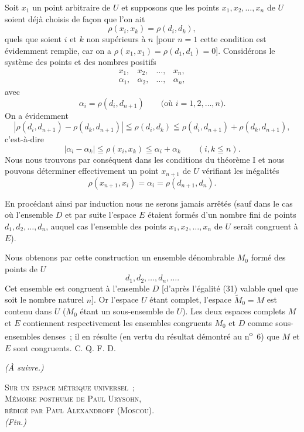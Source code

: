 \documentclass[a4paper,12pt]{amsart}
\newcommand{\srcpage}[1]{} %
\begin{document}
Soit $x_1$ un point arbitraire de $U$ et supposons que les points $x_1,x_2,\dots,x_n$ de $U$ soient déjà choisis de façon que l'on ait
\begin{equation}\tag{30}
\rho(x_i,x_k)=\rho(d_i,d_k),
\end{equation}
quels que soient $i$ et $k$ non supérieurs à $n$ [pour $n=1$ cette condition est évidemment remplie, car on a $\rho(x_1,x_1)=\rho(d_1,d_1)=0$]. Considérons le système des points et des nombres positifs
\[
\begin{array}{cccc}
x_1,&x_2,&\dots,&x_n,\\
\alpha_1,&\alpha_2,&\dots,&\alpha_n,
\end{array}
\]
avec
\[
\alpha_i=\rho(d_i,d_{n+1})\qquad\text{(où $i=1,2,\dots,n$).}
\]
On a évidemment
\[
|\rho(d_i,d_{n+1})-\rho(d_k,d_{n+1})|\leqq\rho(d_i,d_k)
\leqq\rho(d_i,d_{n+1})+\rho(d_k,d_{n+1}),
\]
c'est-à-dire
\[
|\alpha_i-\alpha_k|\leqq\rho(x_i,x_k)\leqq\alpha_i+\alpha_k\qquad(i,k\leqq n).
\]
Nous nous trouvons par conséquent dans les conditions du théorème I et nous pouvons déterminer effectivement un point $x_{n+1}$ de $U$ vérifiant les inégalités
\begin{equation}\tag{31}
\rho(x_{n+1},x_i)=\alpha_i=\rho(d_{n+1},d_n).
\end{equation}
\srcpage{64}
En procédant ainsi par induction nous ne serons jamais arrêtés (sauf dans le cas où l'ensemble $D$ et par suite l'espace $E$ étaient formés d'un nombre fini de points $d_1,d_2,\dots,d_n$, auquel cas l'ensemble des points $x_1,x_2,\dots,x_n$ de $U$ serait congruent à $E$).

Nous obtenons par cette construction un ensemble dénombrable $M_0$ formé des points de $U$
\begin{equation}\tag{32}
d_1,d_2,\dots,d_n,\dots.
\end{equation}
Cet ensemble est congruent à l'ensemble $D$ [d'après l'égalité (31) valable quel que soit le nombre naturel $n$]. Or l'espace $U$ étant complet, l'espace $\widetilde{M}_0=M$ est contenu dans $U$ ($M_0$ étant un sous-ensemble de $U$). Les deux espaces complets $M$ et $E$ contiennent respectivement les ensembles congruents $M_0$ et $D$ comme sous-ensembles denses~; il en résulte (en vertu du résultat démontré au n\textsuperscript{o}~6) que $M$ et $E$ sont congruents.
\hfill C. Q. F. D.

\begin{flushright}\textit{(À suivre.)}\end{flushright}
\srcpage{74}
\begin{center}
\textsc{Sur un espace métrique universel~;}\\
\textsc{Mémoire posthume de Paul Urysohn,}\\
\textsc{rédigé par Paul Alexandroff (Moscou).}\\
\textit{(Fin.)}
\end{center}
\end{document}
